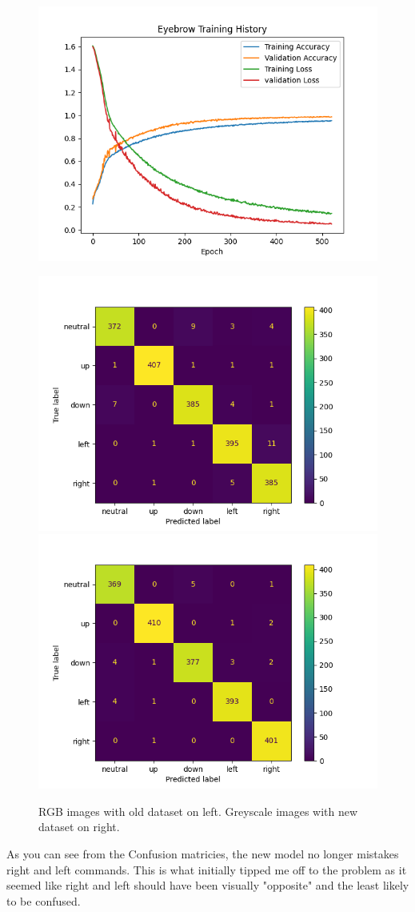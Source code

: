 \documentclass[11pt]{scrartcl} %
\begin{document}
\begin{figure}[ht!] %
	\centering
	\includegraphics[width=0.8\columnwidth]{figures/trainingGraph.png} 
	\caption{}
\end{figure}

\begin{figure}[ht!] %
	\centering
	\includegraphics[width=0.49\columnwidth]{figures/confusionMatrixOld.png} 
	\includegraphics[width=0.49\columnwidth]{figures/confusionMatrix.png} 
	\caption{RGB images with old dataset on left. Greyscale images with new dataset on right.}
\end{figure}

As you can see from the Confusion matricies, the new model no longer mistakes right and left commands. This is what initially tipped me off to the problem as it seemed like right and left should have been visually "opposite" and the least likely to be confused.
\end{document}
